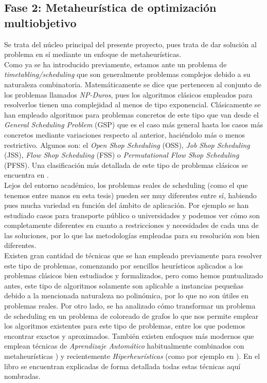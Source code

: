 \subsection{Fase 2: Metaheurística de optimización multiobjetivo} \label{sec:3:metaheurística}
Se trata del núcleo principal del presente proyecto, pues trata de dar solución al problema en sí mediante un enfoque de metaheurísticas.
\\

Como ya se ha introducido previamente, estamos ante un problema de \textit{timetabling/scheduling} que son generalmente problemas complejos debido a su naturaleza combinatoria. 
Matemáticamente se dice que pertenecen al conjunto de los problemas llamados \textit{NP-Duros}, pues los algoritmos clásicos empleados para resolverlos tienen una complejidad al menos de tipo exponencial.
Clásicamente se han empleado algoritmos para problemas concretos de este tipo que van desde el \textit{General Scheduling Problem} (GSP) que es el caso más general hasta los casos más concretos mediante variaciones respecto al anterior, haciéndolo más o menos restrictivo. 
Algunos son: el \textit{Open Shop Scheduling} (OSS), \textit{Job Shop Scheduling} (JSS), \textit{Flow Shop Scheduling} (FSS) o \textit{Permutational Flow Shop Scheduling} (PFSS). Una clasificación más detallada de este tipo de problemas clásicos se encuentra en \cite{sota:tesis-doctoral}. 
\\

Lejos del entorno académico, los problemas reales de scheduling (como el que tenemos entre manos en esta tesis) pueden ser muy diferentes entre sí, habiendo pues mucha variedad en función del ámbito de aplicación. 
Por ejemplo se han estudiado casos para transporte público \cite{sota:transporte-publico} o universidades \cite{sota:universidad} y podemos ver cómo son completamente diferentes en cuanto a restricciones y necesidades de cada una de las soluciones, por lo que las metodologías empleadas para su resolución son bien diferentes.
\\

Existen gran cantidad de técnicas que se han empleado previamente para resolver este tipo de problemas, comenzando por sencillos heurísticos aplicados a los problemas clásicos bien estudiados y formalizados, pero como hemos puntualizado antes, este tipo de algoritmos solamente son aplicable a instancias pequeñas debido a la mencionada naturaleza no polinómica, por lo que no son útiles en problemas reales. Por otro lado, se ha analizado cómo transformar un problema de scheduling en un problema de coloreado de grafos \cite{sota:estudio-coloreado-grafos, sota:algotimo-coloreado-grafos} lo que nos permite emplear los algoritmos existentes para este tipo de problemas, entre los que podemos encontrar exactos y aproximados. También existen enfoques más modernos que emplean técnicas de \textit{Aprendizaje Automático} habitualmente combinados con metaheurísticas \cite{sota:machine-learning-geneticos}) y recientemente \textit{Hiperheurísticas} (como por ejemplo en \cite{sota:hiperheuristicas}). En el libro \cite{sota:libro-sota-scheduling} se encuentran explicadas de forma detallada todas estas técnicas aquí nombradas.
\\

